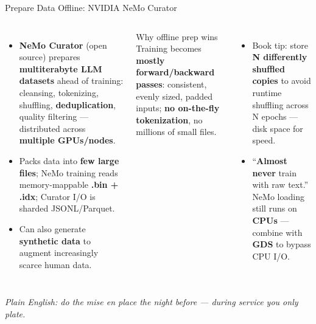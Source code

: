 \documentclass[aspectratio=169]{beamer}
\newcommand{\kw}[1]{\textbf{\textcolor{kwblue}{#1}}}
\newcommand{\pe}[1]{\par{\setlength{\fboxsep}{2.5pt}\noindent\colorbox{navy!9}{\parbox{\dimexpr\textwidth-5pt\relax}{\footnotesize\itshape Plain English: #1}}}}
\begin{document}
\begin{frame}{Prepare Data Offline: NVIDIA NeMo Curator}
  \begin{columns}[t]
    \begin{itemize}\small
      \item \kw{NeMo Curator} (open source) prepares \kw{multiterabyte LLM datasets} ahead of
            training: cleansing, tokenizing, shuffling, \kw{deduplication}, quality filtering
            --- distributed across \kw{multiple GPUs/nodes}.
      \item Packs data into \kw{few large files}; NeMo training reads memory-mappable
            \kw{.bin + .idx}; Curator I/O is sharded JSONL/Parquet.
      \item Can also generate \kw{synthetic data} to augment increasingly scarce human data.
    \end{itemize}
    \begin{block}{Why offline prep wins}
      \small Training becomes \kw{mostly forward/backward passes}: consistent, evenly
      sized, padded inputs; \kw{no on-the-fly tokenization}, no millions of small files.
    \end{block}
    \begin{itemize}\small
      \item Book tip: store \kw{N differently shuffled copies} to avoid runtime shuffling
            across N epochs --- disk space for speed.
      \item ``\kw{Almost never} train with raw text.'' NeMo loading still runs on
            \kw{CPUs} --- combine with \kw{GDS} to bypass CPU I/O.
    \end{itemize}
  \end{columns}
  \pe{do the mise en place the night before --- during service you only plate.}
\end{frame}
\end{document}

